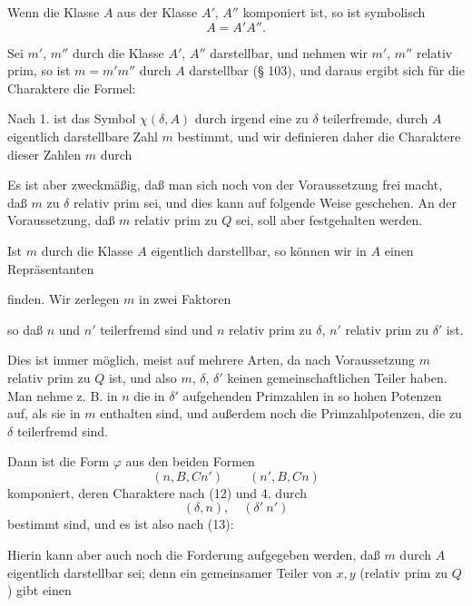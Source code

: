 
Wenn die Klasse $A$ aus der Klasse $A'$, $A''$ komponiert ist,
so ist symbolisch
\[
A = A'A''.
\]

Sei $m'$, $m''$ durch die Klasse $A'$, $A''$ darstellbar, und nehmen
wir $m'$, $m''$ relativ prim, so ist $m = m'm''$ durch $A$ darstellbar
(§ 103), und daraus ergibt sich für die Charaktere die Formel:


Nach 1. ist das Symbol $\chi(\delta, A)$ durch irgend eine zu $\delta$
teilerfremde, durch $A$ eigentlich darstellbare Zahl $m$ bestimmt,
und wir definieren daher die Charaktere dieser Zahlen $m$ durch


Es ist aber zweckmäßig, daß man sich noch von der Voraussetzung frei macht, daß $m$ zu $\delta$ relativ prim sei, und dies
kann auf folgende Weise geschehen. An der Voraussetzung, daß
$m$ relativ prim zu $Q$ sei, soll aber festgehalten werden.

Ist $m$ durch die Klasse $A$ eigentlich darstellbar, so können
wir in $A$ einen Repräsentanten


finden. Wir zerlegen $m$ in zwei Faktoren


so daß $n$ und $n'$ teilerfremd sind und $n$ relativ prim zu $\delta$, $n'$
relativ prim zu $\delta'$ ist.

Dies ist immer möglich, meist auf mehrere Arten, da nach
Voraussetzung $m$ relativ prim zu $Q$ ist, und also $m$, $\delta$, $\delta'$ keinen
gemeinschaftlichen Teiler haben. Man nehme z. B. in $n$ die in
$\delta'$ aufgehenden Primzahlen in so hohen Potenzen auf, als sie
in $m$ enthalten sind, und außerdem noch die Primzahlpotenzen,
die zu $\delta$ teilerfremd sind.

Dann ist die Form $\varphi$ aus den beiden Formen
\[
(n, B, Cn') \qquad (n', B, Cn)
\]
komponiert, deren Charaktere nach (12) und 4. durch
\[
(\delta, n), \quad (\delta'\ n') %
\]
bestimmt sind, und es ist also nach (13):


Hierin kann aber auch noch die Forderung aufgegeben
werden, daß $m$ durch $A$ eigentlich darstellbar sei; denn ein
gemeinsamer Teiler von $x, y$ (relativ prim zu $Q$) gibt einen
